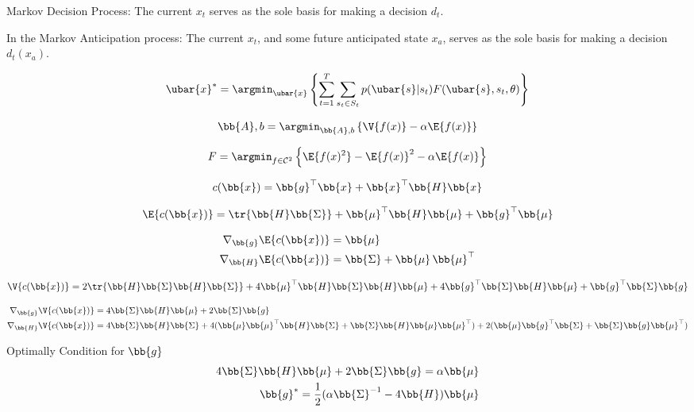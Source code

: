 





\newpage

Markov Decision Process: The current $x_{t}$ serves as the sole basis for making a decision $d_{t}$. 

In the Markov Anticipation process: The current $x_{t}$, and some future anticipated state $x_{a}$, serves as the sole basis for making a decision $d_{t}(x_{a})$. 

\begin{equation}
    \ubar{x}^*=\argmin_{\ubar{x}} \left\{  \sum^{T}_{t=1}   \sum_{s_t \in S_t} p(\ubar{s}|s_{t}) F(\ubar{s},s_t,\theta) \right\} 
\end{equation}



\begin{equation}
    {\bb{A},b}=\argmin_{\bb{A},b} \left\{ \V{f(x)} - \alpha \E{f(x) } \right\} 
\end{equation}



\begin{equation}
    F=\argmin_{f \in \mathcal{C}^2} \left\{ \E{f(x)^2} - \E{f(x)}^2 - \alpha \E{f(x) }    \right\} 
\end{equation}



\begin{align}
    c(\bb{x}) = \bb{g}^\top \bb{x} + \bb{x}^\top \bb{H} \bb{x}
\end{align}

\begin{align}
\E{c(\bb{x})}= \tr{\bb{H}\bb{\Sigma}}+ \bb{\mu}^\top \bb{H} \bb{\mu} + \bb{g}^\top \bb{\mu}
\end{align}


\begin{align}
\nabla_{\bb{g}} \E{c(\bb{x})} &= \bb{\mu} \\
\nabla_{\bb{H}} \E{c(\bb{x})} &= \bb{\Sigma} + \bb{\mu} \, \bb{\mu}^\top
\end{align}





\begin{align}
\V{c(\bb{x})}= 2 \tr{ \bb{H}\bb{\Sigma} \bb{H}\bb{\Sigma}} + 4 \bb{\mu}^\top \bb{H}\bb{\Sigma} \bb{H} \bb{\mu} + 4 \bb{g}^\top \bb{\Sigma} \bb{H}\bb{\mu} + \bb{g}^\top \bb{\Sigma} \bb{g}
\end{align}


\begin{align}
    \nabla_{\bb{g}} \V{c(\bb{x})} &= 4 \bb{\Sigma} \bb{H}\bb{\mu} + 2\bb{\Sigma} \bb{g} \\
    \nabla_{\bb{H}} \V{c(\bb{x})} &= 4 \bb{\Sigma}\bb{H}\bb{\Sigma} + 4(\bb{\mu} \bb{\mu}^\top \bb{H} \bb{\Sigma} +\bb{\Sigma} \bb{H} \bb{\mu} \bb{\mu}^\top ) + 2(\bb{\mu} \bb{g}^\top \bb{\Sigma} + \bb{\Sigma}\bb{g}\bb{\mu}^\top) 
\end{align}



Optimally Condition for $\bb{g}$
\begin{align}
     4 \bb{\Sigma} \bb{H}\bb{\mu} + 2\bb{\Sigma} \bb{g} = \alpha \bb{\mu} \\
     \bb{g}^* = \frac{1}{2} ( \alpha \bb{\Sigma}^{-1}   -  4 \bb{H} )\bb{\mu} \\
\end{align}




